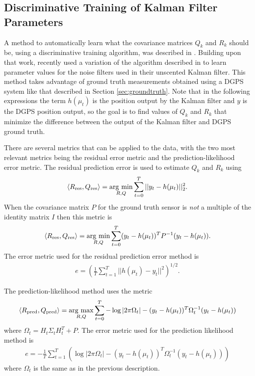 \subsection{Discriminative Training of Kalman Filter Parameters}
\label{sec:kftrainingparams}
A method to automatically learn what the covariance matrices $Q_k$ and $R_k$ should be, using a discriminative training algorithm, was described in \cite{Abbeel-RSS-05}. Building upon that work, \cite{SakaiKuroda10} recently used a variation of the algorithm described in \cite{Abbeel-RSS-05} to learn parameter values for the noise filters used in their unscented Kalman filter. This method takes advantage of ground truth measurements obtained using a DGPS system like that described in Section \ref{sec:groundtruth}. Note that in the following expressions the term $h(\mu_t)$ is the position output by the Kalman filter and $y$ is the DGPS position output, so the goal is to find values of $Q_k$ and $R_k$ that minimize the difference between the output of the Kalman filter and DGPS ground truth.

There are several metrics that can be applied to the data, with the two most relevant metrics being the residual error metric and the prediction-likelihood error metric. The residual prediction error is used to estimate $Q_k$ and $R_k$ using
\begin{align*}
\left<R_{\text{res}},Q_{\text{res}}\right> = \mathop{\arg\,\min}\limits_{R,Q}\sum_{t=0}^T ||y_t-h(\mu_t)||_2^2.
\end{align*}
When the covariance matrix $P$ for the ground truth sensor is \textit{not} a multiple of the identity matrix $I$ then this metric is
\begin{align*}
\left<R_{\text{res}},Q_{\text{res}}\right> = \mathop{\arg\,\min}\limits_{R,Q}\sum_{t=0}^T (y_t-h(\mu_t))^TP^{-1}(y_t-h(\mu_t)).
\end{align*}
The error metric used for the residual prediction error method is
\begin{align}
\label{eq:kftrainingres}
e = \left(\frac{1}{T}\sum_{t=1}^T ||h(\mu_t)-y_t||^2\right)^{1/2}.
\end{align}

The prediction-likelihood method uses the metric
\begin{align*}
\left<R_{\text{pred}},Q_{\text{pred}}\right> = \mathop{\arg\,\max}\limits_{R,Q}\sum_{t=0}^T -\log|2\pi\Omega_t| - (y_t-h(\mu_t))^T\Omega_t^{-1}(y_t-h(\mu_t))
\end{align*}
where $\Omega_t = H_t\Sigma_tH_t^T+P$. The error metric used for the prediction likelihood method is
\begin{align}
\label{eq:kftrainingpred}
e = -\frac{1}{T}\sum_{t=1}^T \left(\log|2\pi\Omega_t| - (y_t-h(\mu_t))^T\Omega_t^{-1}(y_t-h(\mu_t))\right)
\end{align}
where $\Omega_t$ is the same as in the previous description.

